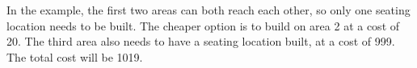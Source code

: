 In the example, the first two areas can both reach each other, so only one seating location needs to be built. The cheaper option is to build on area 2 at a cost of 20. The third area also needs to have a seating location built, at a cost of 999. The total cost will be 1019.